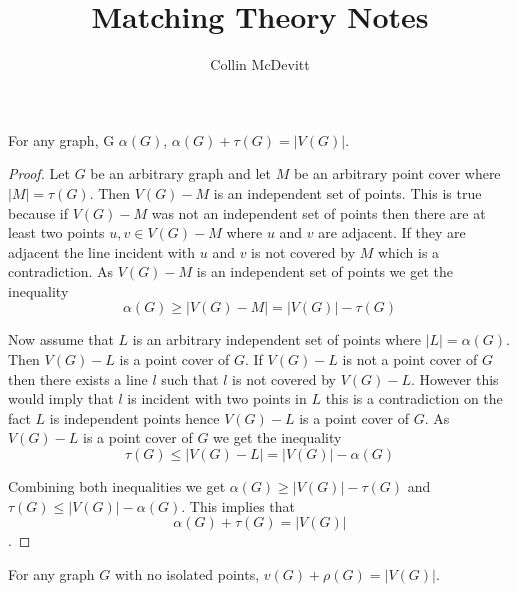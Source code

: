 \documentclass[12pt]{article}
\newenvironment{lemma}[2][Lemma]{\begin{trivlist}
\item[\hskip \labelsep {\bfseries #1}\hskip \labelsep {\bfseries #2.}]}{\end{trivlist}}
\begin{document}
\date{}


\title{Matching Theory Notes}
\author{Collin McDevitt}

\maketitle

\begin{lemma}{1.0.1}
    For any graph, G $\alpha (G)$, $\alpha (G)+\tau(G)=|V(G)|$.
\end{lemma}

\begin{proof}
    Let $G$ be an arbitrary graph and let $M$ be an arbitrary point cover where $|M|=\tau(G)$.
    Then $V(G)-M$ is an independent set of points. This is true because if $V(G)-M$ was not an independent set of points then
    there are at least two points $u,v \in V(G)-M$ where $u$ and $v$ are adjacent. If they are adjacent the line incident with $u$ and $v$ is not covered by $M$ which is a contradiction.
    As $V(G)-M$ is an independent set of points we get the inequality $$\alpha(G) \geq |V(G)-M|= |V(G)|-\tau (G)$$

    Now assume that $L$ is an arbitrary independent set of points where $|L|=\alpha(G)$. Then $V(G)-L$ is a point cover of $G$. If $V(G)-L$ is not a point cover of $G$ then there exists a line $l$ such that $l$ is not covered by $V(G)-L$. However this would imply that $l$ is incident with two points in $L$ this is a contradiction on the fact $L$ is independent points hence $V(G)-L$ is a point cover of $G$. As $V(G)-L$ is a point cover of $G$ we get
    the inequality $$\tau(G) \leq |V(G)-L|=|V(G)|-\alpha(G)$$

    Combining both inequalities we get $\alpha(G) \geq |V(G)|-\tau(G)$ and $\tau(G) \leq |V(G)|-\alpha(G)$. This implies that $$\alpha(G)+\tau(G)=|V(G)|$$.
\end{proof}

\begin{lemma}{1.0.2}
    For any graph $G$ with no isolated points, $v(G)+\rho(G)=|V(G)|$.

\end{lemma}
\end{document}
